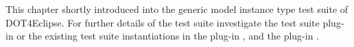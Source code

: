 This chapter shortly introduced into the generic model instance type test suite of \acl{DOT4Eclipse}. For further details of the test suite investigate the test suite plug-in  or the existing test suite instantiations in the plug-in , and the plug-in .
